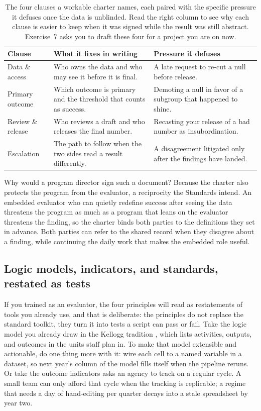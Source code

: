 \begin{table}[htbp]
\centering
\footnotesize
\caption[The one-page charter's four clauses]{The four clauses a workable charter names, each paired with the specific pressure it defuses once the data is unblinded. Read the right column to see why each clause is easier to keep when it was signed while the result was still abstract. Exercise~7 asks you to draft these four for a project you are on now.}
\label{tab:ch01-viz-charter}
\footnotesize
\begin{tabular}{@{}p{2.0cm}p{3.6cm}p{3.5cm}@{}}
\hline
\textbf{Clause} & \textbf{What it fixes in writing} & \textbf{Pressure it defuses} \\
\hline
Data \& access & Who owns the data and who may see it before it is final. & A late request to re-cut a null before release. \\
Primary outcome & Which outcome is primary and the threshold that counts as success. & Demoting a null in favor of a subgroup that happened to shine. \\
Review \& release & Who reviews a draft and who releases the final number. & Recasting your release of a bad number as insubordination. \\
Escalation & The path to follow when the two sides read a result differently. & A disagreement litigated only after the findings have landed. \\
\hline
\end{tabular}
\end{table}

Why would a program director sign such a document? Because the charter also protects the program from the evaluator, a reciprocity the Standards intend. An embedded evaluator who can quietly redefine success after seeing the data threatens the program as much as a program that leans on the evaluator threatens the finding, so the charter binds both parties to the definitions they set in advance. Both parties can refer to the shared record when they disagree about a finding, while continuing the daily work that makes the embedded role useful.

\subsection{Logic models, indicators, and standards, restated as tests}
If you trained as an evaluator, the four principles will read as restatements of tools you already use, and that is deliberate: the principles do not replace the standard toolkit, they turn it into tests a script can pass or fail. Take the logic model you already draw in the Kellogg tradition \parencite{kellogg2004logic}, which lists activities, outputs, and outcomes in the units staff plan in. To make that model extensible and actionable, do one thing more with it: wire each cell to a named variable in a dataset, so next year's column of the model fills itself when the pipeline reruns. Or take the outcome indicators \textcite{hatry2006performance} asks an agency to track on a regular cycle. A small team can only afford that cycle when the tracking is replicable; a regime that needs a day of hand-editing per quarter decays into a stale spreadsheet by year two.

